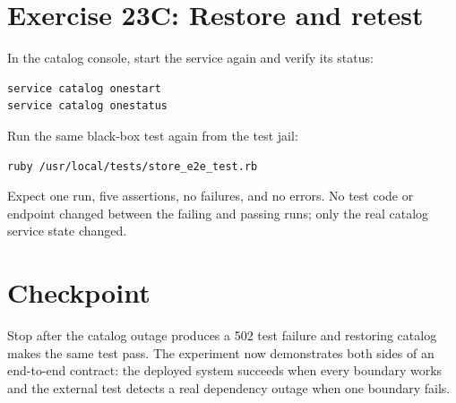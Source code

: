 \section{Exercise 23C: Restore and retest}

In the catalog console, start the service again and verify its status:

\begin{lstlisting}[language=sh]
service catalog onestart
service catalog onestatus
\end{lstlisting}

Run the same black-box test again from the test jail:

\begin{lstlisting}[language=sh]
ruby /usr/local/tests/store_e2e_test.rb
\end{lstlisting}

Expect one run, five assertions, no failures, and no errors. No test code or
endpoint changed between the failing and passing runs; only the real catalog
service state changed.

\section{Checkpoint}

Stop after the catalog outage produces a 502 test failure and restoring catalog
makes the same test pass. The experiment now demonstrates both sides of an
end-to-end contract: the deployed system succeeds when every boundary works and
the external test detects a real dependency outage when one boundary fails.
